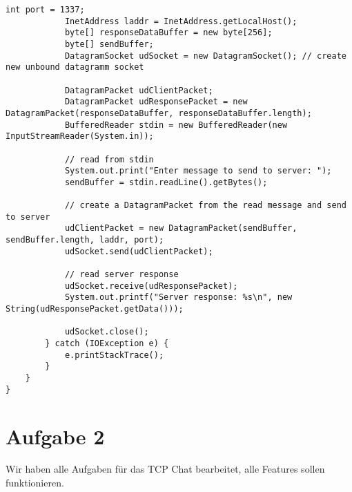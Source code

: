 \begin{enumerate}
\begin{lstlisting}[style=java]
            int port = 1337;
            InetAddress laddr = InetAddress.getLocalHost();
            byte[] responseDataBuffer = new byte[256];
            byte[] sendBuffer;
            DatagramSocket udSocket = new DatagramSocket(); // create new unbound datagramm socket

            DatagramPacket udClientPacket;
            DatagramPacket udResponsePacket = new DatagramPacket(responseDataBuffer, responseDataBuffer.length);
            BufferedReader stdin = new BufferedReader(new InputStreamReader(System.in));

            // read from stdin
            System.out.print("Enter message to send to server: ");
            sendBuffer = stdin.readLine().getBytes();

            // create a DatagramPacket from the read message and send to server
            udClientPacket = new DatagramPacket(sendBuffer, sendBuffer.length, laddr, port);
            udSocket.send(udClientPacket);

            // read server response
            udSocket.receive(udResponsePacket);
            System.out.printf("Server response: %s\n", new String(udResponsePacket.getData()));

            udSocket.close();
        } catch (IOException e) {
            e.printStackTrace();
        }
    }
}

\end{lstlisting}

\end{enumerate}

\section*{Aufgabe 2}
Wir haben alle Aufgaben für das TCP Chat bearbeitet, alle Features sollen funktionieren.

